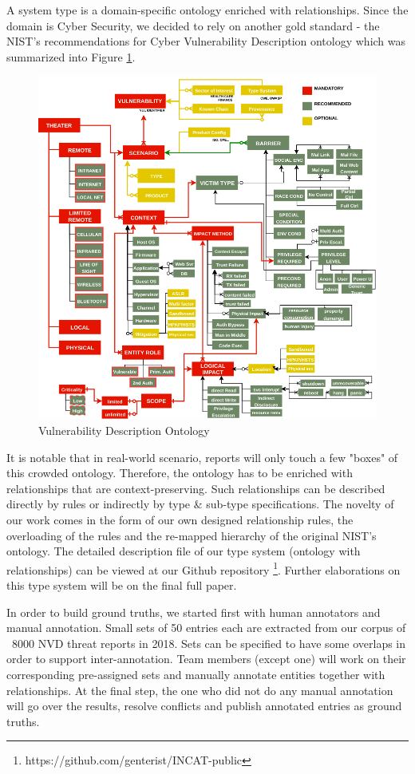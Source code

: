 \documentclass{article} %
\begin{document}
A system type is a domain-specific ontology enriched with relationships. Since the domain is Cyber Security, we decided to rely on another gold standard - the NIST's recommendations for Cyber Vulnerability Description ontology \cite{Booth2016DraftOntology} which was summarized into Figure \ref{Figure:VulOntology}.

\begin{figure}[h]
  \centering
  \includegraphics[width=12cm]{images/NISTIR8138.png}
  \caption{Vulnerability Description Ontology}
  \label{Figure:VulOntology}
\end{figure}

It is notable that in real-world scenario, reports will only touch a few "boxes" of this crowded ontology. Therefore, the ontology has to be enriched with relationships that are context-preserving. Such relationships can be described directly by rules or indirectly by type \& sub-type specifications. The novelty of our work comes in the form of our own designed relationship rules, the overloading of the rules and the re-mapped hierarchy of the original NIST's ontology. The detailed description file of our type system (ontology with relationships) can be viewed at our Github repository \footnote{https://github.com/genterist/INCAT-public}. Further elaborations on this type system will be on the final full paper.

In order to build ground truths, we started first with human annotators and manual annotation. Small sets of 50 entries each are extracted from our corpus of ~8000 NVD threat reports in 2018. Sets can be specified to have some overlaps in order to support inter-annotation. Team members (except one) will work on their corresponding pre-assigned sets and manually annotate entities together with relationships. At the final step, the one who did not do any manual annotation will go over the results, resolve conflicts and publish annotated entries as ground truths.
\end{document}

